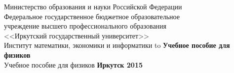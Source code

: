 \documentclass[a4paper,14pt, openany, twoside, draft]{extbook} %
\newcommand{\aaa}[2][acolor]{\noindent\textcolor{eclr}%
{+\ [}\textcolor{#1}{#2}\textcolor{eclr}{]}}
\begin{document}

\renewcommand{\refname}{Список использованных источников} %
\renewcommand{\bibname}{\refname}
\begin{titlepage}
\thispagestyle{empty}
\begin{center}{\small{}
Министерство образования и науки
Российской Федерации\\
Федеральное государственное бюджетное образовательное\\
учреждение высшего профессионального образования\\
<<Иркутский государственный университет>> \\
Институт математики, экономики и информатики
}
\vfill
\hbox to \linewidth{\hfill\bfseries А.~Л.~Финкельштейн, Т.~Ю.~Черкашина\hfill}
 \vspace{2em}
{\large\bfseries Учебное пособие для физиков}\\
\vspace{1em}
{Учебное пособие для физиков}
\vfill
\vfill
 \textbf{Иркутск 2015}
\end{center}
\end{titlepage}

\clearpage
\tableofcontents
\clearpage
\end{document}
